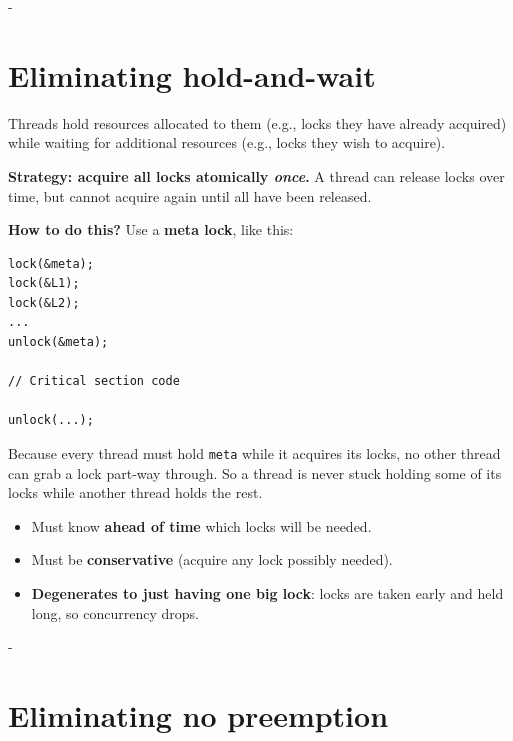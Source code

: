 \documentclass[11pt,a4paper]{article}
\makeatletter
\newcommand{\keepspace}[1]{\par\penalty-100\begingroup
  \setlength{\dimen@}{#1}\dimen@ii\pagegoal\advance\dimen@ii-\pagetotal
  \ifdim\dimen@>\dimen@ii\ifdim\dimen@ii>\z@\vfil\fi\break\fi\endgroup}
\makeatother
\begin{document}
\keepspace{12\baselineskip}
\section{Eliminating hold-and-wait}

\begin{defbox}
Threads hold resources allocated to them (e.g., locks they have already
acquired) while waiting for additional resources (e.g., locks they wish to
acquire).
\end{defbox}

\textbf{Strategy: acquire all locks atomically \emph{once}.} A thread can
release locks over time, but cannot acquire again until all have been
released.

\textbf{How to do this?} Use a \textbf{meta lock}, like this:

\begin{lstlisting}
lock(&meta);
lock(&L1);
lock(&L2);
...
unlock(&meta);

// Critical section code

unlock(...);
\end{lstlisting}

Because every thread must hold \texttt{meta} while it acquires its locks, no
other thread can grab a lock part-way through. So a thread is never stuck
holding some of its locks while another thread holds the rest.

\begin{warnbox}[Disadvantages?]
\begin{itemize}
  \item Must know \textbf{ahead of time} which locks will be needed.
  \item Must be \textbf{conservative} (acquire any lock possibly needed).
  \item \textbf{Degenerates to just having one big lock}: locks are taken
        early and held long, so concurrency drops.
\end{itemize}
\end{warnbox}

\keepspace{12\baselineskip}
\section{Eliminating no preemption}
\end{document}
